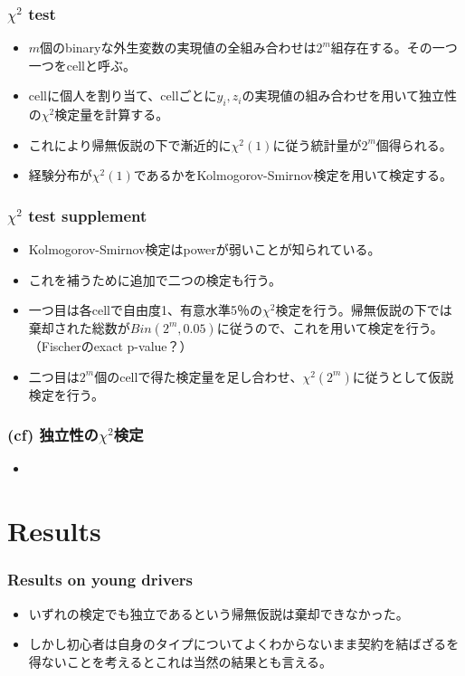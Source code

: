 \documentclass[dvipdfmx, 12pt]{beamer}
\begin{document}
\begin{frame}\frametitle{$\chi^2$ test}
	\begin{itemize}
	\item $m$個のbinaryな外生変数の実現値の全組み合わせは$2^m$組存在する。その一つ一つをcellと呼ぶ。
	\item cellに個人を割り当て、cellごとに$y_i, z_i$の実現値の組み合わせを用いて独立性の$\chi^2$検定量を計算する。
	\item これにより帰無仮説の下で漸近的に$\chi^2(1)$に従う統計量が$2^m$個得られる。
	\item 経験分布が$\chi^2(1)$であるかをKolmogorov-Smirnov検定を用いて検定する。
	\end{itemize}
\end{frame}

\begin{frame}\frametitle{$\chi^2$ test supplement}
	\begin{itemize}
	\item Kolmogorov-Smirnov検定はpowerが弱いことが知られている。
	\item これを補うために追加で二つの検定も行う。
	\item 一つ目は各cellで自由度1、有意水準5％の$\chi^2$検定を行う。帰無仮説の下では棄却された総数が$Bin(2^m, 0.05)$に従うので、これを用いて検定を行う。（Fischerのexact p-value？）
	\item 二つ目は$2^m$個のcellで得た検定量を足し合わせ、$\chi^2(2^m)$に従うとして仮説検定を行う。
	\end{itemize}
\end{frame}

\begin{frame}\frametitle{(cf) 独立性の$\chi^2$検定}
	\begin{itemize}
	\item 
	\end{itemize}
\end{frame}

\section{Results}
\begin{frame}\frametitle{Results on young drivers}
	\begin{itemize}
	\item いずれの検定でも独立であるという帰無仮説は棄却できなかった。
	\item しかし初心者は自身のタイプについてよくわからないまま契約を結ばざるを得ないことを考えるとこれは当然の結果とも言える。
	\end{itemize}
\end{frame}
\end{document}
